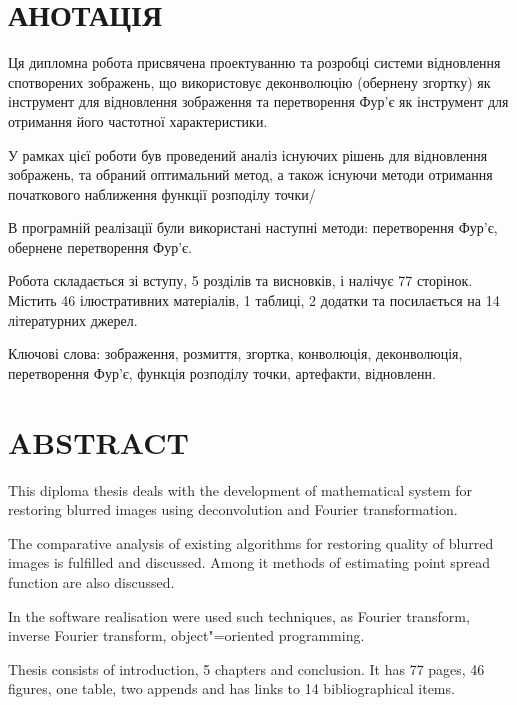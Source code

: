\documentclass{diploma}
\begin{document}
\chapter*{АНОТАЦІЯ}
  \thispagestyle{empty}
  Ця дипломна робота присвячена проектуванню та розробці системи відновлення
  спотворених зображень, що використовує деконволюцію (обернену згортку) як
  інструмент для відновлення зображення та перетворення Фур’є як інструмент
  для отримання його частотної характеристики.

  У рамках цієї роботи був проведений аналіз існуючих рішень для відновлення
  зображень, та обраний оптимальний метод, а також існуючи методи отримання
  початкового наближення функції розподілу точки/

  В програмній реалізації були використані наступні методи: перетворення
  Фур’є, обернене перетворення Фур’є.

  Робота складається зі вступу, 5 розділів та висновків, і налічує 77
  сторінок.
  Містить 46 ілюстративних матеріалів, 1 таблиці, 2 додатки та посилається на
  14 літературних джерел.

  Ключові слова: зображення, розмиття, згортка, конволюція, деконволюція,
  перетворення Фур’є, функція розподілу точки, артефакти, відновленн.
  \clearpage
\chapter*{ABSTRACT}
  \thispagestyle{empty}
  This diploma thesis deals with the development of mathematical system for
  restoring blurred images using deconvolution and Fourier transformation.

  The comparative analysis of existing algorithms for restoring quality of
  blurred images is fulfilled and discussed.
  Among it methods of estimating point spread function are also discussed.

  In the software realisation were used such techniques, as Fourier
  transform, inverse Fourier transform, object"=oriented programming.

  Thesis consists of introduction, 5 chapters and conclusion.
  It has 77 pages, 46 figures, one table, two appends and has links to 14
  bibliographical items.
\end{document}

